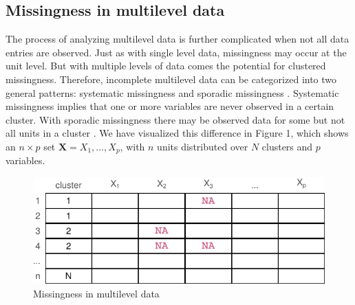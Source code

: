 \documentclass[
]{jss}
\begin{document}
\hypertarget{missingness-in-multilevel-data}{%
\subsection{Missingness in multilevel
data}\label{missingness-in-multilevel-data}}

The process of analyzing multilevel data is further complicated when not
all data entries are observed. Just as with single level data,
missingness may occur at the unit level. But with multiple levels of
data comes the potential for clustered missingness. Therefore,
incomplete multilevel data can be categorized into two general patterns:
systematic missingness and sporadic missingness \citep{resc13}.
Systematic missingness implies that one or more variables are never
observed in a certain cluster. With sporadic missingness there may be
observed data for some but not all units in a cluster
\citep{buur18, jola18}. We have visualized this difference in Figure 1,
which shows an \(n \times p\) set \(\mathbf{X} = X_1, \dots, X_p\), with
\(n\) units distributed over \(N\) clusters and \(p\) variables.

\begin{CodeChunk}
\begin{figure}

{\centering \includegraphics{Imputation_of_Incomplete_Multilevel_Data_files/figure-latex/patterns-1} 

}

\caption[Missingness in multilevel data]{Missingness in multilevel data}\label{fig:patterns}
\end{figure}
\end{CodeChunk}
\end{document}
